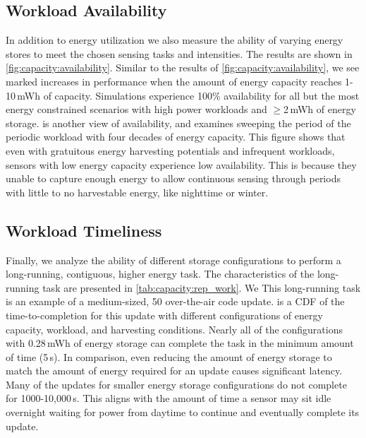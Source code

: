 
\subsection{Workload Availability}
\label{sec:capacity:availability}

In addition to energy utilization we also measure the ability of varying energy stores to meet the chosen 
sensing tasks and intensities. 
The results are
shown in \cref{fig:capacity:availability}. 
Similar to the results of \cref{fig:capacity:availability}, we see marked
increases in performance when the amount of energy capacity reaches 1-10\,mWh
of capacity.
Simulations experience 100\% availability for all but
the most energy constrained scenarios with high power workloads and
$\geq$2\,mWh of energy storage.
 is another view of availability, and examines sweeping the period of the periodic workload with four decades of energy capacity.
This figure shows that even 
with gratuitous energy harvesting potentials and infrequent workloads, sensors with low energy capacity experience low
availability.
This is because they
unable to capture enough energy to allow continuous sensing through periods with little to no harvestable energy, like nighttime or winter. 

\subsection{Workload Timeliness}
Finally, we analyze the ability of different storage configurations to perform a 
long-running, contiguous, higher energy task. 
The characteristics of the long-running task are presented in \cref{tab:capacity:rep_work}. We 
This long-running task is an example of a medium-sized, 50\ssi{\kilo\byte} over-the-air code update.
 is a CDF of the time-to-completion for this update with different configurations of energy capacity, workload, and harvesting conditions.
Nearly all of the configurations with
0.28\,mWh of energy storage can complete the task in the minimum amount of time (5\,s). In comparison,
even reducing the amount of energy storage to match the amount of energy
required for an update causes significant latency. 
Many of the updates for smaller energy storage configurations
do not complete for 1000-10,000\,s.
This aligns with the amount of time a sensor may sit
idle overnight waiting for power from daytime to continue and eventually complete its update.

